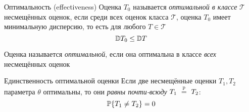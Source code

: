 \begin{dfn}{Оптимальность (effectiveness)}
Оценка $T_0$ называется \emph{оптимальной в классе} $\mathcal T$ несмещённых оценок,
если среди всех оценок класса $\mathcal T$,
оценка $T_0$ имеет минимальную дисперсию,
то есть для любого $T\in\mathcal T$
$$\mathbb D T_0 \leq \mathbb D T$$

Оценка называется \emph{оптимальной},
если она оптимальна в классе \emph{всех} несмещённых оценок
\end{dfn}

\begin{thm}{Единственность оптимальной оценки}
Если две несмещённые оценки $T_1, T_2$ параметра $\theta$ оптимальны,
то они \emph{равны почти-всюду} $T_1~\overset{\mathbb P}{=}~T_2$:
  $$\mathbb P\{T_1\neq T_2\} = 0$$
\end{thm}
